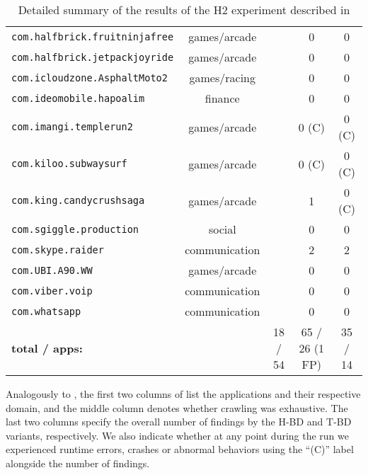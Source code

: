 \begin{table*}
\begin{small}
\begin{center}
\begin{tabular}{l|c|c|c|c}
	{\tt com.halfbrick.fruitninjafree}					& games/arcade 		& 		      		& 0 & 0 \\
	{\tt com.halfbrick.jetpackjoyride}				& games/arcade 		&\checkmark	& 0 & 0 \\
	{\tt com.icloudzone.AsphaltMoto2}				& games/racing 		& 		      		& 0 & 0 \\
	{\tt com.ideomobile.hapoalim}					& finance 				& 		      		& 0 & 0 \\
	{\tt com.imangi.templerun2} 					& games/arcade 		& 		      		& 0 (C) & 0 (C) \\
	{\tt com.kiloo.subwaysurf} 						& games/arcade 		& 		      		& 0 (C) & 0 (C) \\
	{\tt com.king.candycrushsaga}					& games/arcade 		& 		      		& 1 & 0 (C) \\
	{\tt com.sgiggle.production}					& social 					& 		      		& 0       & 0     \\
	{\tt com.skype.raider} 						& communication 			& 		      		& 2 	& 2 \\
	{\tt com.UBI.A90.WW} 						& games/arcade 			& 		      		& 0        & 0   \\
	{\tt com.viber.voip} 							& communication 			&		      		& 0        & 0    \\
	{\tt com.whatsapp} 							& communication 			&		      		& 0        & 0   \\
	\hline \hline
	{\bf total / apps:}	& & 18 / 54  & 65 / 26 (1 FP)  & 35 / 14
	\end{tabular}
	\end{center}
	\caption{\label{Ta:realworldAll}Detailed summary of the results of the H2 experiment described in }
\end{small}
\end{table*} 

Analogously to , the first two columns of  list the applications and their respective domain, and the middle column denotes whether crawling was exhaustive. The last two columns specify the overall number of findings by the H-BD and T-BD variants, respectively. We also indicate whether at any point during the run we experienced runtime errors, crashes or abnormal behaviors using the ``(C)'' label alongside the number of findings.


